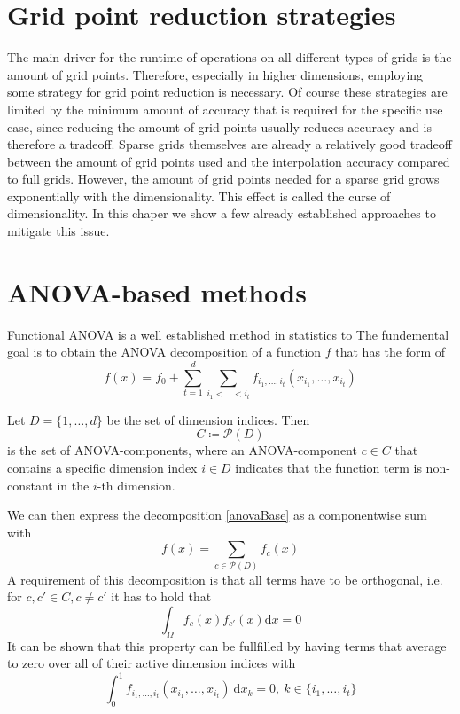\documentclass[
  a4paper,  %
  twoside,  %
  bibliography=totoc,
  headsepline,
  cleardoublepage=empty,
  parskip=half,
  draft=false
]{scrbook}
\begin{document}
\chapter{Grid point reduction strategies}

The main driver for the runtime of operations on all different types of grids is the amount of grid points.
Therefore, especially in higher dimensions, employing some strategy for grid point reduction is necessary.
Of course these strategies are limited by the minimum amount of accuracy that is required for the specific use case, since reducing the amount of grid points usually reduces accuracy and is therefore a tradeoff.
Sparse grids themselves are already a relatively good tradeoff between the amount of grid points used and the interpolation accuracy compared to full grids.
However, the amount of grid points needed for a sparse grid grows exponentially with the dimensionality.
This effect is called the curse of dimensionality.
In this chaper we show a few already established approaches to mitigate this issue.

\chapter{ANOVA-based methods}

Functional ANOVA is a well established method in statistics to 
The fundemental goal is to obtain the ANOVA decomposition of a function $f$ that has the form of
\begin{equation}
f(x)=f_0 + \sum_{t=1}^d \sum_{i_1 < \dots < i_t} f_{i_1,\dots,i_t}(x_{i_1},\dots,x_{i_t})
\label{anovaBase}
\end{equation}

\begin{definition}
Let $D=\{1,\dots,d\}$ be the set of dimension indices.
Then
\begin{equation}
C \coloneqq \mathcal{P}(D)
\end{equation}
is the set of ANOVA-components, where an ANOVA-component $c \in C$ that contains a specific dimension index $i \in D$ indicates that the function term is non-constant in the $i$-th dimension.
\end{definition}
We can then express the decomposition \eqref{anovaBase} as a componentwise sum with
\begin{equation}
f(x)=\sum_{c \in \mathcal{P}(D)} f_{c}(x)
\end{equation}
A requirement of this decomposition is that all terms have to be orthogonal, i.e. for $c,c' \in C, c \neq c'$ it has to hold that
\begin{equation}
\int_{\Omega} f_c(x) f_{c'}(x) \text{d}x = 0
\end{equation}
It can be shown that this property can be fullfilled by having terms that average to zero over all of their active dimension indices with
\begin{equation}
\int_0^1 f_{i_1,\dots,i_t}(x_{i_1},\dots,x_{i_t}) ~ \text{d}x_k = 0, ~ k \in \{i_1, \dots, i_t\}
\end{equation}
\end{document}
